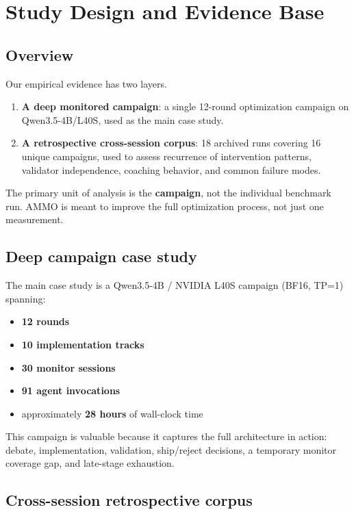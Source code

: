 \documentclass[11pt]{article}
\begin{document}
\section{Study Design and Evidence Base}

\subsection{Overview}

Our empirical evidence has two layers.

\begin{enumerate}[leftmargin=*,itemsep=2pt]
  \item \textbf{A deep monitored campaign}: a single 12-round optimization campaign on Qwen3.5-4B/L40S, used as the main case study.
  \item \textbf{A retrospective cross-session corpus}: 18 archived runs covering 16 unique campaigns, used to assess recurrence of intervention patterns, validator independence, coaching behavior, and common failure modes.
\end{enumerate}

The primary unit of analysis is the \textbf{campaign}, not the individual benchmark run. AMMO is meant to improve the full optimization process, not just one measurement.

\subsection{Deep campaign case study}

The main case study is a Qwen3.5-4B / NVIDIA L40S campaign (BF16, TP=1) spanning:

\begin{itemize}[leftmargin=*,itemsep=2pt]
  \item \textbf{12 rounds}
  \item \textbf{10 implementation tracks}
  \item \textbf{30 monitor sessions}
  \item \textbf{91 agent invocations}
  \item approximately \textbf{28 hours} of wall-clock time
\end{itemize}

This campaign is valuable because it captures the full architecture in action: debate, implementation, validation, ship/reject decisions, a temporary monitor coverage gap, and late-stage exhaustion.

\subsection{Cross-session retrospective corpus}
\end{document}
